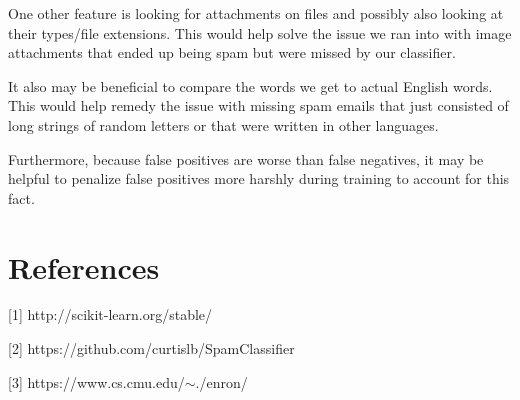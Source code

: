 \documentclass{article} %
\begin{document}
One other feature is looking for attachments on files and possibly also looking at their types/file extensions. This would help solve the issue we ran into with image attachments that ended up being spam but were missed by our classifier. 

It also may be beneficial to compare the words we get to actual English words. This would help remedy the issue with missing spam emails that just consisted of long strings of random letters or that were written in other languages. 

Furthermore, because false positives are worse than false negatives, it may be helpful to penalize false positives more harshly during training to account for this fact. 

\section{References}

[1] http://scikit-learn.org/stable/

[2] https://github.com/curtislb/SpamClassifier

[3] https://www.cs.cmu.edu/$\sim$./enron/
\end{document}
